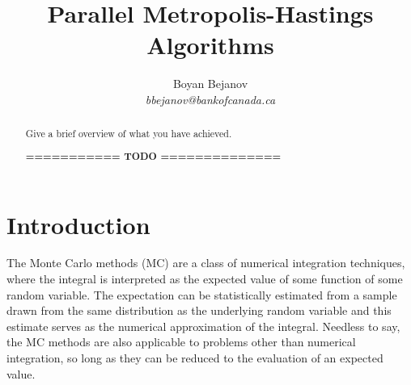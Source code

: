 \documentclass[11pt,letterpaper]{article}       %
\begin{document}


\title{Parallel Metropolis-Hastings Algorithms}


\author{
Boyan Bejanov\\
{\em bbejanov@bankofcanada.ca}
} %

\maketitle

\begin{abstract}
Give a brief overview of what you have achieved.

\textbf{=========== TODO ==============}

\end{abstract}


\section{Introduction} \label{intro}

The Monte Carlo methods (MC) are a class of numerical integration techniques,
where the integral is interpreted as the expected value of some function of
some random variable.  The expectation can be statistically estimated from a
sample drawn from the same distribution as the underlying random variable and
this estimate serves as the numerical approximation of the integral.  Needless
to say, the MC methods are also applicable to problems other than numerical
integration, so long as they can be reduced to the evaluation of an expected
value.  
\end{document}
